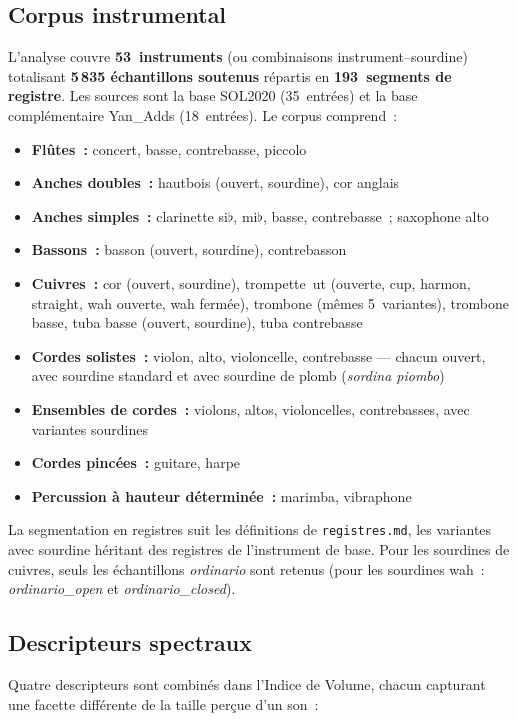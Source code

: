 \documentclass[journal]{IEEEtran}
\begin{document}
\subsection{Corpus instrumental}

L'analyse couvre \textbf{53~instruments} (ou combinaisons instrument--sourdine) totalisant \textbf{5\,835 échantillons soutenus} répartis en \textbf{193~segments de registre}. Les sources sont la base SOL2020 (35~entrées) et la base complémentaire Yan\_Adds (18~entrées). Le corpus comprend~:

\begin{itemize}[nosep]
\item \textbf{Flûtes~:} concert, basse, contrebasse, piccolo
\item \textbf{Anches doubles~:} hautbois (ouvert, sourdine), cor anglais
\item \textbf{Anches simples~:} clarinette si$\flat$, mi$\flat$, basse, contrebasse~; saxophone alto
\item \textbf{Bassons~:} basson (ouvert, sourdine), contrebasson
\item \textbf{Cuivres~:} cor (ouvert, sourdine), trompette~ut (ouverte, cup, harmon, straight, wah ouverte, wah fermée), trombone (mêmes 5~variantes), trombone basse, tuba basse (ouvert, sourdine), tuba contrebasse
\item \textbf{Cordes solistes~:} violon, alto, violoncelle, contrebasse --- chacun ouvert, avec sourdine standard et avec sourdine de plomb (\textit{sordina piombo})
\item \textbf{Ensembles de cordes~:} violons, altos, violoncelles, contrebasses, avec variantes sourdines
\item \textbf{Cordes pincées~:} guitare, harpe
\item \textbf{Percussion à hauteur déterminée~:} marimba, vibraphone
\end{itemize}

La segmentation en registres suit les définitions de \texttt{registres.md}, les variantes avec sourdine héritant des registres de l'instrument de base. Pour les sourdines de cuivres, seuls les échantillons \textit{ordinario} sont retenus (pour les sourdines wah~: \textit{ordinario\_open} et \textit{ordinario\_closed}).

\subsection{Descripteurs spectraux}

Quatre descripteurs sont combinés dans l'Indice de Volume, chacun capturant une facette différente de la \og taille \fg{} perçue d'un son~:
\end{document}
